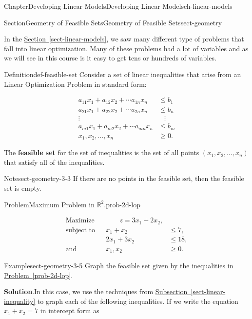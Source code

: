 \documentclass[oneside,10pt,]{book}
\newcommand{\blocktitlefont}{\relax}
\newcommand{\xreffont}{\relax}
\newcommand{\terminology}[1]{\textbf{#1}}
\numberwithin{equation}{section}
\newcommand{\amp}{&}
\begin{document}
\begin{chapterptx}{Chapter}{Developing Linear Models}{}{Developing Linear Models}{}{}{ch-linear-models}
\begin{sectionptx}{Section}{Geometry of Feasible Sets}{}{Geometry of Feasible Sets}{}{}{sect-geometry}
\begin{introduction}{}%
In the \hyperref[sect-linear-models]{Section~{\xreffont\ref{sect-linear-models}}}, we saw many different type of problems that fall into linear optimization. Many of these problems had a lot of variables and as we will see in this course is it easy to get tens or hundreds of variables.%
\begin{definition}{Definition}{}{def-feasible-set}%
Consider a set of linear inequalities that arise from an Linear Optimization Problem in standard form:%
\par
%
\begin{align*}
a_{11} x_1 + a_{12} x_2 + \cdots a_{1n} x_n \amp \leq b_1 \\
a_{21} x_1 + a_{22} x_2 + \cdots a_{2n} x_n \amp \leq b_n \\
\vdots \; \amp \;\;\; \vdots\\
a_{m1} x_1 + a_{m2} x_2 + \cdots a_{mn} x_n \amp \leq b_m \\
x_1, x_2, \ldots, x_n \amp \geq 0.
\end{align*}
%
\par
The \terminology{feasible set} for the set of inequalities is the set of all points \((x_1, x_2, \ldots, x_n)\) that satisfy all of the inequalities.%
\end{definition}
\begin{note}{Note}{}{sect-geometry-3-3}%
If there are no points in the feasible set, then the feasible set is empty.%
\end{note}
\begin{problem}{Problem}{Maximum Problem in \(\mathbb{R}^2\).}{prob-2d-lop}%
%
\par
%
\begin{equation*}
\begin{aligned} \text{Maximize}\amp\amp  \qquad z = 3x_1 + 2x_2, \amp  \\ \text{subject to} \amp \amp x_1 + x_2  \amp \leq 7, \\ \amp \amp 2x_1+ 3x_2  \amp \leq 18, \\ \text{and} \amp \amp x_1, x_2 \amp \geq 0.
\end{aligned}
\end{equation*}
%
\end{problem}
\begin{example}{Example}{}{sect-geometry-3-5}%
Graph the feasible set given by the inequalities in \hyperref[prob-2d-lop]{Problem~{\xreffont\ref{prob-2d-lop}}}.%
\par\smallskip%
\noindent\textbf{\blocktitlefont Solution}.\hypertarget{sect-geometry-3-5-2}{}\quad{}In this case, we use the techniques from \hyperref[sect-linear-inequality]{Subsection~{\xreffont\ref{sect-linear-inequality}}} to graph each of the following inequalities. If we write the equation \(x_1 + x_2 = 7\) in intercept form as%

\end{example}
\end{introduction}
\end{sectionptx}
\end{chapterptx}
\end{document}
